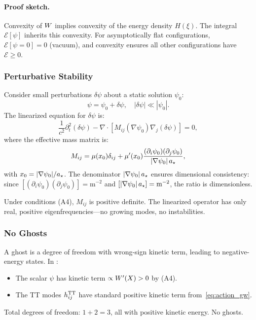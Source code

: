 \paragraph{Proof sketch.}
Convexity of $W$ implies convexity of the energy density $H(\xi)$. 
The integral $\mathcal{E}[\psi]$ inherits this convexity. For 
asymptotically flat configurations, $\mathcal{E}[\psi = 0] = 0$ (vacuum), 
and convexity ensures all other configurations have $\mathcal{E} \geq 0$.

\subsubsection{Perturbative Stability}

Consider small perturbations $\delta\psi$ about a static solution $\psi_0$:
\begin{equation}
\psi = \psi_0 + \delta\psi, \quad |\delta\psi| \ll |\psi_0|.
\end{equation}
The linearized equation for $\delta\psi$ is:
\begin{equation}
\frac{1}{c^2}\partial_t^2(\delta\psi) - \nabla\cdot[M_{ij}(\nabla\psi_0)
\nabla_j(\delta\psi)] = 0,
\end{equation}
where the effective mass matrix is:
\begin{equation}
M_{ij} = \mu(x_0)\delta_{ij} + \mu'(x_0)\frac{(\partial_i\psi_0)
(\partial_j\psi_0)}{|\nabla\psi_0|\,a_\star},
\end{equation}
with $x_0 = |\nabla\psi_0|/a_\star$. The denominator $|\nabla\psi_0|\,a_\star$ ensures dimensional consistency: since $[(\partial_i\psi_0)(\partial_j\psi_0)] = \text{m}^{-2}$ and $[|\nabla\psi_0|\,a_\star] = \text{m}^{-2}$, the ratio is dimensionless.

Under conditions (A4), $M_{ij}$ is positive definite. The linearized 
operator has only real, positive eigenfrequencies---no growing modes, 
no instabilities.

\subsubsection{No Ghosts}

A ghost is a degree of freedom with wrong-sign kinetic term, leading to 
negative-energy states. In \DFD:
\begin{itemize}
\item The scalar $\psi$ has kinetic term $\propto W'(X) > 0$ by (A4).
\item The TT modes $h_{ij}^{\rm TT}$ have standard positive kinetic term 
from~\eqref{eq:action_gw}.
\end{itemize}
Total degrees of freedom: $1 + 2 = 3$, all with positive kinetic energy. 
No ghosts.

